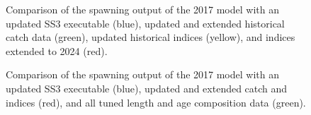 \documentclass[
]{scrartcl}
\begin{document}
\begin{figure}


\caption{\label{fig-bridge5-comp2}Comparison of the spawning output of
the 2017 model with an updated SS3 executable (blue), updated and
extended historical catch data (green), updated historical indices
(yellow), and indices extended to 2024 (red).}

\end{figure}%

\begin{figure}


\caption{\label{fig-bridge14-comp2}Comparison of the spawning output of
the 2017 model with an updated SS3 executable (blue), updated and
extended catch and indices (red), and all tuned length and age
composition data (green).}

\end{figure}%
\end{document}
